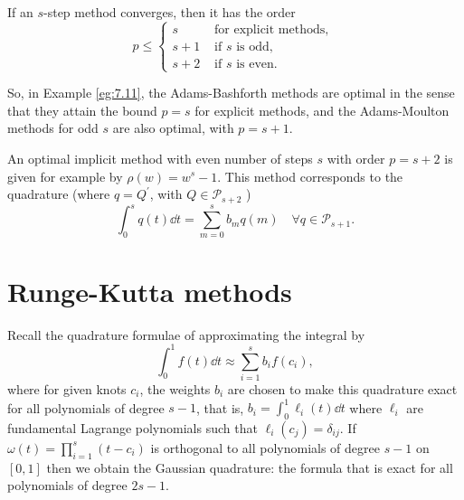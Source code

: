 \documentclass[a4paper]{article}
\begin{document}
\begin{theorem}
    If an $s$-step method converges, then it has the order
\[
p \leq \begin{cases}
s & \text { for explicit methods, } \\
s+1 & \text { if } s \text { is odd, } \\
s+2 & \text { if } s \text { is even. }
\end{cases}
\]
\end{theorem}
So, in Example \ref{eg:7.11}, the Adams-Bashforth methods are optimal in the sense that they attain the bound $p=s$ for explicit methods, and the Adams-Moulton methods for odd $s$ are also optimal, with $p=s+1$.

An optimal implicit method with even number of steps $s$ with order $p=s+2$ is given for example by $\rho(w)=w^s-1$. This method corresponds to the quadrature (where $q=Q^{\prime}$, with $Q \in \mathcal{P}_{s+2}$ )
\[
\int_0^s q(t) \dd{t}=\sum_{m=0}^s b_m q(m) \quad \forall q \in \mathcal{P}_{s+1} .
\]

\section{Runge-Kutta methods}

Recall the quadrature formulae of approximating the integral by 
\begin{equation}
    \int_{0}^{1} f(t) \dd{t} \approx \sum_{i=1}^{s}b_i f(c_i),
\end{equation}
where for given knots $c_i$, the weights $b_i$ are chosen to make this quadrature exact for all polynomials of degree $s-1$, that is, $ b_i = \int_{0}^{1} \ell_i (t) \dd{t} $ where $\ell_i$ are fundamental Lagrange polynomials such that $ \ell_i(c_j) = \delta_{ij} $. 
If $ \omega(t) = \prod_{i=1}^{s}(t-c_i) $ is orthogonal to all polynomials of degree $s-1$ on $[0,1]$ then we obtain the Gaussian quadrature: the formula that is exact for all polynomials of degree $2s-1$. 
\end{document}
